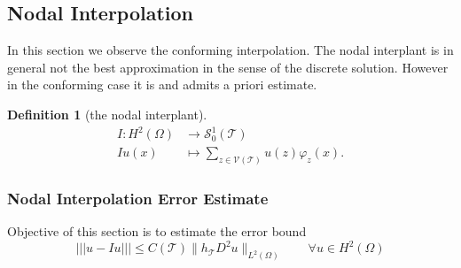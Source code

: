 \documentclass[a4paper,12pt,oneside,fleqn]{book}
\theoremstyle{definition}
\newtheorem{definition}{Definition}[section]
\theoremstyle{remark}
\begin{document}
\subsection{Nodal Interpolation}
In this section we observe the conforming interpolation. The nodal interplant is in general not the best approximation in the sense of the discrete solution. However in the conforming case it is and admits a priori estimate. 

\begin{definition}[the nodal interplant]
\begin{equation}
\begin{aligned}
	I: H^2(\Omega) &\rightarrow \mathcal{S}_0^1(\mathcal{T})  \\
	Iu(x) &\mapsto \sum_{z \in \mathcal{V}(\mathcal{T})} u(z) \varphi_z(x).  	
\end{aligned}
\end{equation}
\end{definition}









\subsubsection{Nodal Interpolation Error Estimate}
Objective of this section is to estimate the error bound
\begin{equation}
	||| u - Iu ||| \le C(\mathcal{T}) \| h_{\mathcal{T}}  D^2 u\|_{L^2(\Omega)} \qquad \forall u \in H^2(\Omega)
\end{equation}
\end{document}
